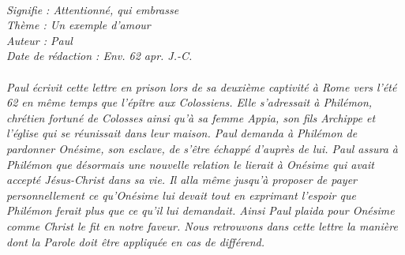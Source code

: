 \BFont
\noindent\hrulefill
\textit{
\bigskip
{\centering{}
\\Signifie : Attentionné, qui embrasse
\\Thème : Un exemple d'amour
\\Auteur : Paul
\\Date de rédaction : Env. 62 apr. J.-C.\\}
}
\textit{
\\Paul écrivit cette lettre en prison lors de sa deuxième captivité à Rome vers l’été 62 en même temps que l’épître aux Colossiens. Elle s’adressait à Philémon, chrétien fortuné de Colosses ainsi qu’à sa femme Appia, son fils Archippe et l’église qui se réunissait dans leur maison. Paul demanda à Philémon de pardonner Onésime, son esclave, de s’être échappé d’auprès de lui. Paul assura à Philémon que désormais une nouvelle relation le lierait à Onésime qui avait accepté Jésus-Christ dans sa vie. Il alla même jusqu’à proposer de payer personnellement ce qu’Onésime lui devait tout en exprimant l’espoir que Philémon ferait plus que ce qu’il lui demandait. Ainsi Paul plaida pour Onésime comme Christ le fit en notre faveur. Nous retrouvons dans cette lettre la manière dont la Parole doit être appliquée en cas de différend.\bigskip
}
\par\nobreak\noindent\hrulefill
